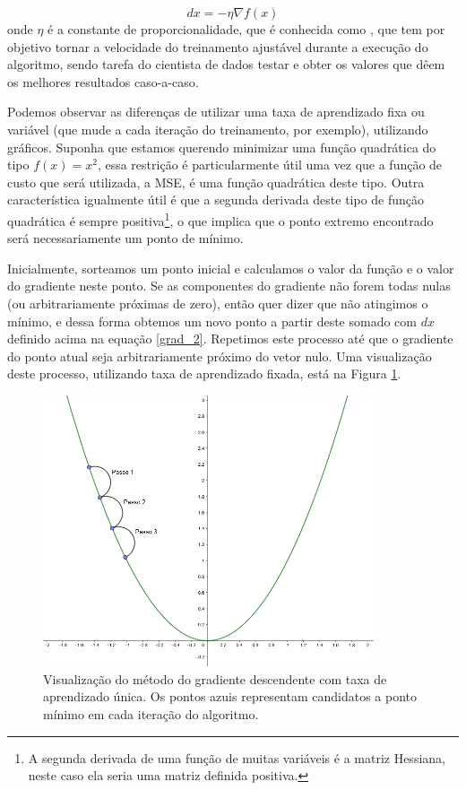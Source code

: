 \begin{equation}\label{grad_2}
dx = - \eta \nabla f(x)
\end{equation}
onde $\eta$ é a constante de proporcionalidade, que é conhecida como , que tem por objetivo tornar a velocidade do treinamento ajustável durante a execução do algoritmo, sendo tarefa do cientista de dados testar e obter os valores que dêem os melhores resultados caso-a-caso. 

Podemos observar as diferenças de utilizar uma taxa de aprendizado fixa ou variável (que mude a cada iteração do treinamento, por exemplo), utilizando gráficos. Suponha que estamos querendo minimizar uma função quadrática do tipo $f(x) = x^2$, essa restrição é particularmente útil uma vez que a função de custo que será utilizada, a MSE, é uma função quadrática deste tipo. Outra característica igualmente útil é que a segunda derivada deste tipo de função quadrática é sempre positiva\footnote{A segunda derivada de uma função de muitas variáveis é a matriz Hessiana, neste caso ela seria uma matriz definida positiva.}, o que implica que o ponto extremo encontrado será necessariamente um ponto de mínimo.

Inicialmente, sorteamos um ponto inicial e calculamos o valor da função e o valor do gradiente neste ponto. Se as componentes do gradiente não forem todas nulas (ou arbitrariamente próximas de zero), então quer dizer que não atingimos o mínimo, e dessa forma obtemos um novo ponto a partir deste somado com $dx$ definido acima na equação \ref{grad_2}. Repetimos este processo até que o gradiente do ponto atual seja arbitrariamente próximo do vetor nulo. Uma visualização deste processo, utilizando taxa de aprendizado fixada, está na Figura \ref{fig:grad_1}.

\begin{figure}[htb]
\centering
\includegraphics[height=8cm]{figuras/grad_1}
\caption{Visualização do método do gradiente descendente com taxa de aprendizado única. Os pontos azuis representam candidatos a ponto mínimo em cada iteração do algoritmo.}
\label{fig:grad_1}
\end{figure}

